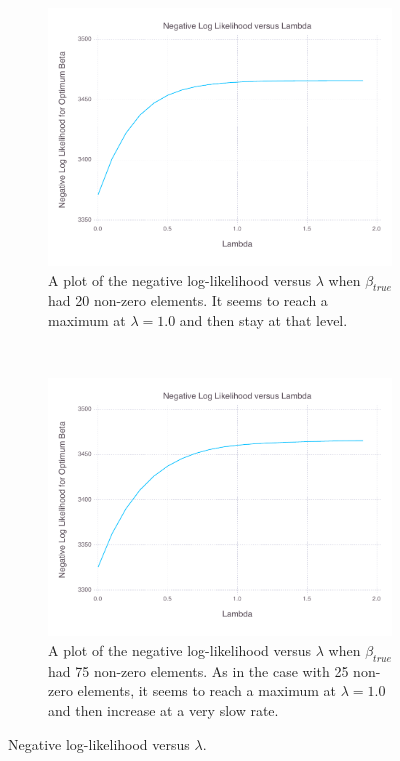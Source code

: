 \documentclass[12pt, leqno]{article}
\begin{document}
\begin{figure}
\centering 
\begin{subfigure}[b]{0.5\textwidth}
  \includegraphics[width=\textwidth]{nlogoptplotcount-20.pdf}
  \caption{A plot of the negative log-likelihood versus $\lambda$ when
    $\beta_{true}$ had 20 non-zero elements. It seems to reach a
    maximum at $\lambda = 1.0$ and then stay at that level.}
\label{fig:nll20}
\end{subfigure}\\
\begin{subfigure}[b]{0.5\textwidth}
  \includegraphics [width=\textwidth]{nlogoptplotcount-75.pdf}
  \caption{A plot of the negative log-likelihood versus $\lambda$ when
    $\beta_{true}$ had 75 non-zero elements. As in the case with 25
    non-zero elements, it seems to reach a
    maximum at $\lambda = 1.0$ and then increase at a very slow rate.}
\label{fig:nll75}
\end{subfigure}
        \caption{Negative log-likelihood versus $\lambda$. }\label{fig:sparse}
\end{figure}
\end{document}
